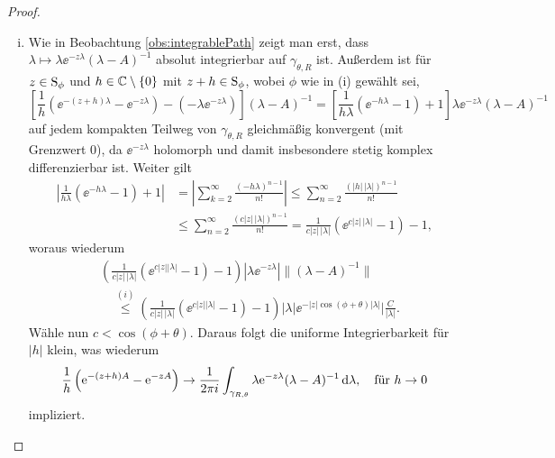 \begin{proof}
\begin{enumerate}[(i)]
    \item Wie in Beobachtung \ref{obs:integrablePath} zeigt man erst, dass $\lambda \mapsto \lambda \ee^{-z\lambda}(\lambda - A)^{-1}$ absolut integrierbar auf $\gamma_{\theta,R}$ ist.
      Außerdem ist für $z \in \mathrm{S}_\phi$ und $h \in \mathbb{C}\setminus\{0\}$ mit $z + h \in \mathrm{S}_\phi$, wobei $\phi$ wie in (i) gewählt sei, 
      $$
      \left[ \frac{1}{h} \left( \ee^{-(z + h)\lambda} - \ee^{-z\lambda} \right) - (- \lambda \ee^{-z\lambda}) \right] (\lambda - A)^{-1}
      = \left[ \frac{1}{h\lambda} \left( \ee^{-h\lambda} - 1\right) + 1\right] \lambda \ee^{-z\lambda}  (\lambda - A)^{-1}
      $$
      auf jedem kompakten Teilweg von $\gamma_{\theta,R}$ gleichmäßig konvergent (mit Grenzwert 0), da $\ee^{-z\lambda}$ holomorph und damit insbesondere stetig komplex differenzierbar ist.
      Weiter gilt
      \begin{align*}
        | \frac{1}{h\lambda} (\ee^{-h\lambda} - 1) + 1 |
        &= | \sum_{k = 2}^\infty \frac{(-h \lambda)^{n - 1}}{n!} |
        \leq \sum_{n = 2}^\infty \frac{(|h| \, |\lambda|)^{n - 1}}{n!} \\
        &\leq \sum_{n = 2}^\infty \frac{(c |z| \, |\lambda|)^{n - 1}}{n!}
        = \frac{1}{c|z|\, |\lambda|} (\ee^{c|z|\,|\lambda|} - 1) - 1,
      \end{align*}
      woraus wiederum
      \begin{align*}
        &\left( \frac{1}{c |z|\, |\lambda|} (\ee^{c |z| |\lambda|} - 1) - 1 \right) | \lambda \ee^{-z\lambda} | \| (\lambda - A)^{-1} \| \\
        &\quad\overset{(i)}{\leq} \left( \frac{1}{c |z|\, |\lambda|} (\ee^{c |z| |\lambda|} - 1) - 1 \right) | \lambda| \ee^{-|z|\cos(\phi + \theta) |\lambda|} | \frac{C}{|\lambda|}.
      \end{align*}
      Wähle nun $c < \cos(\phi + \theta)$.
      Daraus folgt die uniforme Integrierbarkeit für $|h|$ klein, was wiederum
      $$
      \frac{1}{h} \left(\mathrm{e}^{-(z + h)A} - \mathrm{e}^{-zA} \right) \to 
      \frac{1}{2\pi i} \int_{\gamma_{R, \theta}} \lambda \mathrm{e}^{-z\lambda}(\lambda - A)^{-1} \, {\operatorname{d}\!{\lambda}}, \quad\text{für } h \to 0
      $$
      impliziert.


\end{enumerate}
\end{proof}
